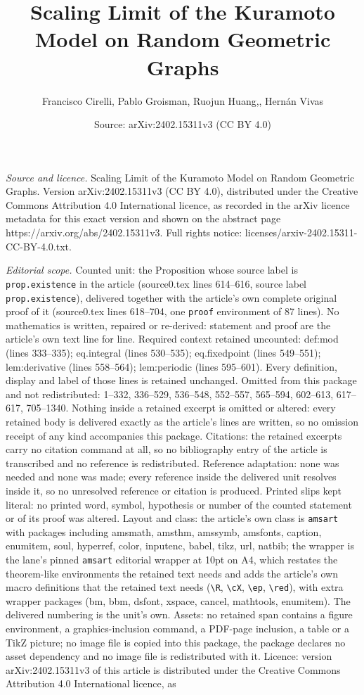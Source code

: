 \documentclass[10pt,a4paper]{amsart}
\title[Scaling Limit of the Kuramoto Model on Random Geometric Grap]{Scaling Limit of the Kuramoto Model on Random Geometric Graphs}
\author{Francisco Cirelli, Pablo Groisman, Ruojun Huang,, Hern\'an Vivas}
\date{Source: arXiv:2402.15311v3 (CC BY 4.0)}
\begin{document}
\maketitle

\noindent\emph{Source and licence.} Scaling Limit of the Kuramoto Model on Random Geometric Graphs. Version arXiv:2402.15311v3 (CC BY 4.0), distributed under the Creative Commons Attribution 4.0 International licence, as recorded in the arXiv licence metadata for this exact version and shown on the abstract page https://arxiv.org/abs/2402.15311v3. Full rights notice: licenses/arxiv-2402.15311-CC-BY-4.0.txt.\par\smallskip

\noindent\textit{Editorial scope.} Counted unit: the Proposition whose source label is \texttt{prop.existence} in the article (source0.tex lines 614--616, source label \texttt{prop.existence}), delivered together with the article's own complete original proof of it (source0.tex lines 618--704, one \texttt{proof} environment of 87 lines). No mathematics is written, repaired or re-derived: statement and proof are the article's own text line for line. Required context retained uncounted: def:mod (lines 333--335); eq.integral (lines 530--535); eq.fixedpoint (lines 549--551); lem:derivative (lines 558--564); lem:periodic (lines 595--601). Every definition, display and label of those lines is retained unchanged. Omitted from this package and not redistributed: 1--332, 336--529, 536--548, 552--557, 565--594, 602--613, 617--617, 705--1340. Nothing inside a retained excerpt is omitted or altered: every retained body is delivered exactly as the article's lines are written, so no omission receipt of any kind accompanies this package. Citations: the retained excerpts carry no citation command at all, so no bibliography entry of the article is transcribed and no reference is redistributed. Reference adaptation: none was needed and none was made; every reference inside the delivered unit resolves inside it, so no unresolved reference or citation is produced. Printed slips kept literal: no printed word, symbol, hypothesis or number of the counted statement or of its proof was altered. Layout and class: the article's own class is \texttt{amsart} with packages including amsmath, amsthm, amssymb, amsfonts, caption, enumitem, soul, hyperref, color, inputenc, babel, tikz, url, natbib; the wrapper is the lane's pinned \texttt{amsart} editorial wrapper at 10pt on A4, which restates the theorem-like environments the retained text needs and adds the article's own macro definitions that the retained text needs (\texttt{\textbackslash R}, \texttt{\textbackslash cX}, \texttt{\textbackslash ep}, \texttt{\textbackslash red}), with extra wrapper packages (bm, bbm, dsfont, xspace, cancel, mathtools, enumitem). The delivered numbering is the unit's own. Assets: no retained span contains a figure environment, a graphics-inclusion command, a PDF-page inclusion, a table or a TikZ picture; no image file is copied into this package, the package declares no asset dependency and no image file is redistributed with it. Licence: version arXiv:2402.15311v3 of this article is distributed under the Creative Commons Attribution 4.0 International licence, as 
\end{document}

